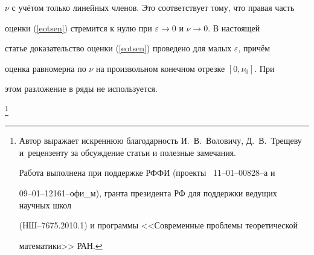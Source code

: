 $\nu$ с учётом только линейных членов. Это соответствует тому, что правая часть

оценки (\ref{eotsen}) стремится к нулю при $\varepsilon \to0$ и $\nu\to0$. В настоящей

статье доказательство оценки (\ref{eotsen}) проведено для малых $\varepsilon $, причём

оценка равномерна по $\nu$ на произвольном конечном отрезке $[0,\nu_0]$. При

этом разложение в ряды не используется.



\thanks{Автор выражает искреннюю благодарность И.~В.~Воловичу, Д.~В.~Трещеву и~рецензенту за обсуждение статьи и полезные замечания.\par

Работа выполнена при поддержке РФФИ (проекты \No\No\ 11--01--00828--а и

09--01--12161--офи\_м), гранта президента РФ для поддержки ведущих научных школ

(НШ--7675.2010.1) и программы <<Современные проблемы теоретической

математики>> РАН.}



